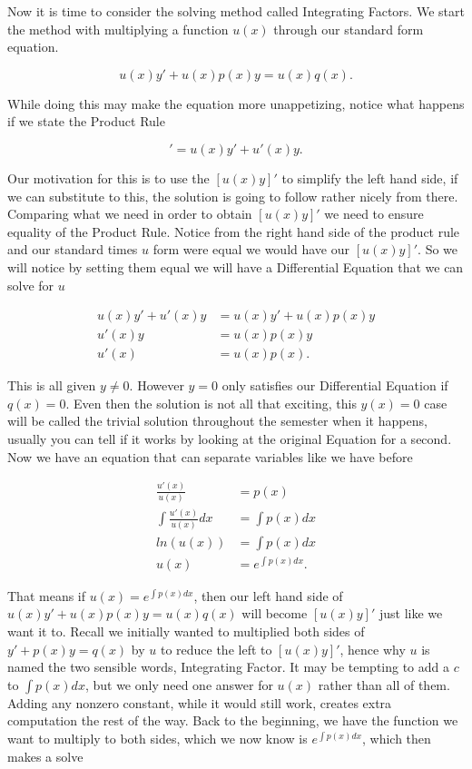 \documentclass[12pt]{article}
\begin{document}
Now it is time to consider the solving method called Integrating Factors. We start the method with multiplying a function $u(x)$ through our standard form equation.

\begin{equation*}
    u(x)y'+ u(x)p(x)y = u(x)q(x).
\end{equation*}

While doing this may make the equation more unappetizing, notice what happens if we state the Product Rule

\begin{equation*}
    [u(x)\cdot y]' = u(x)y'+u'(x)y.
\end{equation*}

Our motivation for this is to use the $[u(x)y]'$ to simplify the left hand side, if we can substitute to this, the solution is going to follow rather nicely from there. Comparing what we need in order to obtain $[u(x)y]'$ we need to ensure equality of the Product Rule. Notice from the right hand side of the product rule and our standard times $u$ form were equal we would have our $[u(x)y]'$. So we will notice by setting them equal we will have a Differential Equation that we can solve for $u$

\begin{align*}
    u(x)y'+u'(x)y &= u(x)y'+ u(x)p(x)y \\
    u'(x)y &= u(x)p(x)y \\
    u'(x) &= u(x)p(x).
\end{align*}

This is all given $y \ne 0$. However $y=0$ only satisfies our Differential Equation if $q(x)=0$. Even then the solution is not all that exciting, this $y(x)=0$ case will be called the trivial solution throughout the semester when it happens, usually you can tell if it works by looking at the original Equation for a second. Now we have an equation that can separate variables like we have before

\begin{align*}
    \frac{u'(x)}{u(x)} &= p(x) \\
    \int \frac{u'(x)}{u(x)} dx &= \int p(x) dx \\
    ln(u(x)) &= \int p(x) dx \\
    u(x) &= e^{\int p(x) dx}.
\end{align*}

That means if $u(x) = e^{\int p(x) dx}$, then our left hand side of $u(x)y'+ u(x)p(x)y = u(x)q(x)$ will become $[u(x)y]'$ just like we want it to. Recall we initially wanted to multiplied both sides of $y'+p(x)y=q(x)$ by $u$ to reduce the left to $[u(x)y]'$, hence why $u$ is named the two sensible words, Integrating Factor. It may be tempting to add a $c$ to $\int p(x) dx$, but we only need one answer for $u(x)$ rather than all of them. Adding any nonzero constant, while it would still work, creates extra computation the rest of the way. Back to the beginning, we have the function we want to multiply to both sides, which we now know is $e^{\int p(x) dx}$, which then makes a solve
\end{document}
